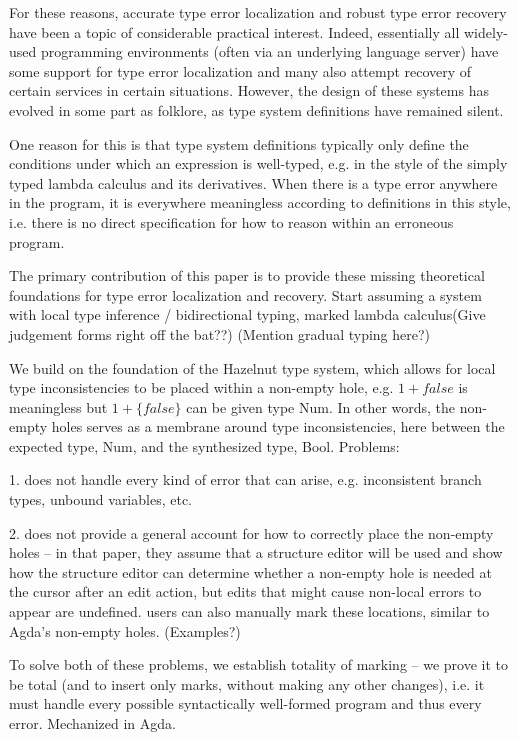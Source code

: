 For these reasons, accurate type error localization and robust type error recovery have been a topic of considerable practical interest. 
Indeed, essentially all widely-used programming environments (often via an underlying language server) have some support for type error 
localization and many also attempt recovery of certain services in certain situations. However, the design of these systems has evolved in some part as folklore, as type system definitions have remained silent.


One reason for this is 
that type system definitions typically only define the conditions under which an expression is well-typed, e.g. in the style of the simply typed lambda calculus and its derivatives. When there is a type error anywhere in the program, it is everywhere meaningless according to definitions in this style, i.e. there is no direct specification for how to reason within an erroneous program. 

The primary contribution of this paper is to provide these missing theoretical foundations for type error localization and recovery. 
Start assuming a system with local type inference / bidirectional typing, marked lambda calculus(Give judgement forms right off the bat??) 
(Mention gradual typing here?)

We build on the foundation of the Hazelnut type system, which allows for local type inconsistencies to be placed within a non-empty hole, 
e.g. $1 + false$ is meaningless but $1 + \{false\}$ can be given type Num. In other words, the non-empty holes serves as a membrane around type inconsistencies, here between the expected type, Num, and the synthesized type, Bool. Problems:

1. does not handle every kind of error that can arise, e.g. inconsistent branch types, unbound variables, etc.

2. does not provide a general account for how to correctly place the non-empty holes -- in that paper, they assume that a structure editor will be used and show how the structure editor can determine whether a non-empty hole is needed at the cursor after an edit action, but edits that might cause non-local errors to appear are undefined. users can also manually mark these locations, similar to Agda's non-empty holes. (Examples?)

To solve both of these problems, we establish totality of marking -- we prove it to be total (and to insert only marks, without making any other changes), i.e. it must handle 
every possible syntactically well-formed program and thus every error. Mechanized in Agda.

